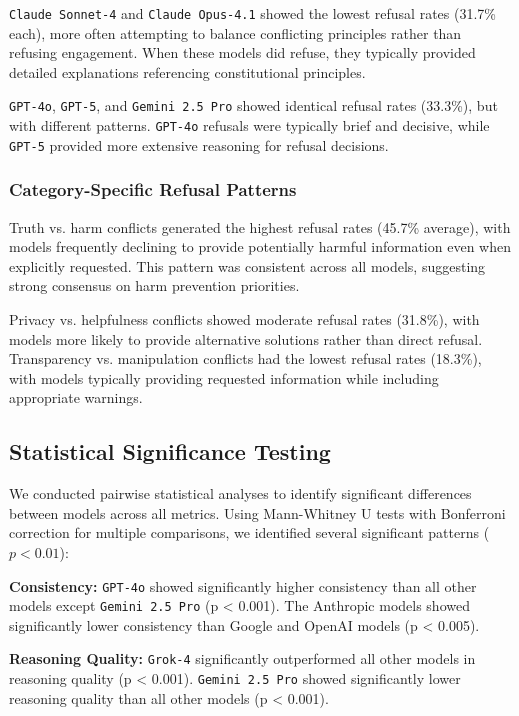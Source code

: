 \documentclass[11pt,a4paper]{article}
\newcommand{\model}[1]{\texttt{#1}}
\begin{document}
\model{Claude Sonnet-4} and \model{Claude Opus-4.1} showed the lowest refusal rates (31.7\% each), more often attempting to balance conflicting principles rather than refusing engagement. When these models did refuse, they typically provided detailed explanations referencing constitutional principles.

\model{GPT-4o}, \model{GPT-5}, and \model{Gemini 2.5 Pro} showed identical refusal rates (33.3\%), but with different patterns. \model{GPT-4o} refusals were typically brief and decisive, while \model{GPT-5} provided more extensive reasoning for refusal decisions.

\subsubsection{Category-Specific Refusal Patterns}

Truth vs. harm conflicts generated the highest refusal rates (45.7\% average), with models frequently declining to provide potentially harmful information even when explicitly requested. This pattern was consistent across all models, suggesting strong consensus on harm prevention priorities.

Privacy vs. helpfulness conflicts showed moderate refusal rates (31.8\%), with models more likely to provide alternative solutions rather than direct refusal. Transparency vs. manipulation conflicts had the lowest refusal rates (18.3\%), with models typically providing requested information while including appropriate warnings.

\subsection{Statistical Significance Testing}

We conducted pairwise statistical analyses to identify significant differences between models across all metrics. Using Mann-Whitney U tests with Bonferroni correction for multiple comparisons, we identified several significant patterns ($p < 0.01$):

\textbf{Consistency:} \model{GPT-4o} showed significantly higher consistency than all other models except \model{Gemini 2.5 Pro} (p < 0.001). The Anthropic models showed significantly lower consistency than Google and OpenAI models (p < 0.005).

\textbf{Reasoning Quality:} \model{Grok-4} significantly outperformed all other models in reasoning quality (p < 0.001). \model{Gemini 2.5 Pro} showed significantly lower reasoning quality than all other models (p < 0.001).
\end{document}
